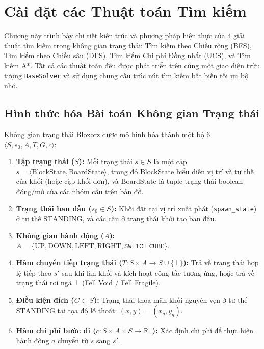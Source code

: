 \section{Cài đặt các Thuật toán Tìm kiếm}
\label{sec:algorithms}

Chương này trình bày chi tiết kiến trúc và phương pháp hiện thực của 4
giải thuật tìm kiếm trong không gian trạng thái: Tìm kiếm theo Chiều
rộng (BFS), Tìm kiếm theo Chiều sâu (DFS), Tìm kiếm Chi phí Đồng nhất
(UCS), và Tìm kiếm A*. Tất cả các thuật toán đều được phát triển trên
cùng một giao diện trừu tượng \texttt{BaseSolver} và sử dụng chung cấu
trúc nút tìm kiếm bất biến tối ưu bộ nhớ.

\subsection{Hình thức hóa Bài toán Không gian Trạng thái}
\label{subsec:formal_search_problem}
Không gian trạng thái Bloxorz được mô hình hóa thành một bộ 6 
$\langle S, s_0, A, T, G, c \rangle$:
\begin{enumerate}[1.]
    \item \textbf{Tập trạng thái ($S$):}
    Mỗi trạng thái $s \in S$ là một cặp
    $s = \langle \text{BlockState}, \text{BoardState} \rangle$,
    trong đó $\text{BlockState}$ biểu diễn vị trí và tư thế của khối
    (hoặc cặp khối đơn), và $\text{BoardState}$ là tuple trạng thái
    boolean đóng/mở của các nhóm cầu trên bản đồ.

    \item \textbf{Trạng thái ban đầu ($s_0 \in S$):}
    Khối đặt tại vị trí xuất phát (\texttt{spawn\_state}) ở tư thế
    $\text{STANDING}$, và các cầu ở trạng thái khởi tạo ban đầu.

    \item \textbf{Không gian hành động ($A$):}
    $A = \{\text{UP}, \text{DOWN}, \text{LEFT}, \text{RIGHT},
    \texttt{SWITCH\_CUBE}\}$.

    \item \textbf{Hàm chuyển tiếp trạng thái
    ($T: S \times A \to S \cup \{\bot\}$):}
    Trả về trạng thái hợp lệ tiếp theo $s'$ sau khi lăn khối và kích hoạt
    công tắc tương ứng, hoặc trả về trạng thái rơi ngã $\bot$ (Fell Void /
    Fell Fragile).

    \item \textbf{Điều kiện đích ($G \subset S$):}
    Trạng thái thỏa mãn khối nguyên vẹn ở tư thế $\text{STANDING}$ tại tọa
    độ lỗ thoát: $(x, y) = (x_g, y_g)$.

    \item \textbf{Hàm chi phí bước đi
    ($c: S \times A \times S \to \mathbb{R}^+$):}
    Xác định chi phí để thực hiện hành động $a$ chuyển từ $s$ sang $s'$.
\end{enumerate}

